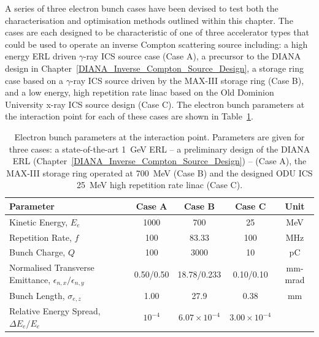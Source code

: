 \documentclass[../main.tex]{subfiles}
\begin{document}
A series of three electron bunch cases have been devised to test both the characterisation and optimisation methods outlined within this chapter. The cases are each designed to be characteristic of one of three accelerator types that could be used to operate an inverse Compton scattering source including: a high energy ERL driven $\gamma$-ray ICS source case (Case A), a precursor to the DIANA design in Chapter~\ref{DIANA_Inverse_Compton_Source_Design}, a storage ring case based on a $\gamma$-ray ICS source driven by the MAX-III storage ring  \cite{owen2013nonequilibrium} (Case B), and a low energy, high repetition rate linac based on the Old Dominion University x-ray ICS source design \cite{krafft2016laser,deitrick2017inverse,deitrick2018high} (Case C). The electron bunch parameters at the interaction point for each of these cases are shown in Table~\ref{tab:char_opt_electron_bunch_parameters}.

\begin{table}[!h]
\centering
\caption{Electron bunch parameters at the interaction point. Parameters are given for three cases: a state-of-the-art 1~\si{\giga\electronvolt} ERL -- a preliminary design of the DIANA ERL (Chapter~\ref{DIANA_Inverse_Compton_Source_Design}) -- (Case A), the MAX-III storage ring operated at 700~\si{\mega\electronvolt} \cite{sjostrom2009max,hansson2011imaging,rosborg2012electron} (Case B) and the designed ODU ICS 25~\si{\mega\electronvolt} high repetition rate linac \cite{krafft2016laser,deitrick2017inverse,deitrick2018high} (Case C).}
\label{tab:char_opt_electron_bunch_parameters}
\begin{tabular}{lcccc}
\hline\hline
Parameter & Case A & Case B & Case C & Unit \\
\hline
Kinetic Energy, $E_{e}$ & 1000 & 700 & 25 & \si{\mega\electronvolt} \\
Repetition Rate, $f$ & 100 & 83.33 & 100 & \si{\mega\hertz} \\
Bunch Charge, $Q$ & 100 & 3000 & 10 & \si{\pico\coulomb} \\
Normalised Transverse Emittance, $\epsilon_{n,x}/\epsilon_{n,y}$ & 0.50/0.50 & 18.78/0.233 & 0.10/0.10 & \si{\milli\meter}-\si{\milli\radian} \\
Bunch Length, $\sigma_{e,z}$ & 1.00 & 27.9 & 0.38 & \si{\milli\meter} \\
Relative Energy Spread, $\Delta E_{e}/E_{e}$ & $10^{-4}$ & $6.07\times 10^{-4}$ & $3.00\times 10^{-4}$ & \\
\hline\hline
\end{tabular}
\label{tab:char_opt_electron_bunch_parameters}
\end{table}
\end{document}
